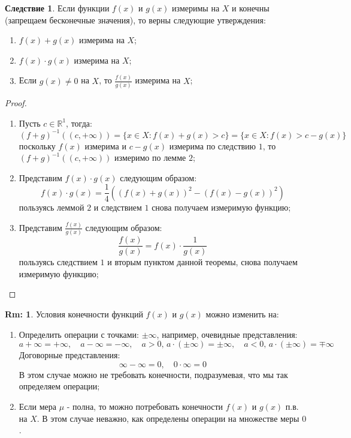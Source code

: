 \documentclass[12pt]{article}
\newcommand{\MR}{\mathbb{R}}
\theoremstyle{definition}
\newtheorem{rem}{Rm:}
\newtheorem{corollary}{Следствие}
\begin{document}
\begin{corollary}
	Если функции $f(x)$ и $g(x)$ измеримы на $X$ и конечны (запрещаем бесконечные значения), то верны следующие утверждения:
	\begin{enumerate}[label = \arabic*)]
		\item $f(x) + g(x)$ измерима на $X$;
		\item $f(x){\cdot}g(x)$ измерима на $X$;
		\item Если $g(x) \neq 0$ на $X$, то $\tfrac{f(x)}{g(x)}$ измерима на $X$;
	\end{enumerate}
\end{corollary}
\begin{proof}\hfill
	\begin{enumerate}[label =\arabic*)]
		\item Пусть $c \in \MR^1$, тогда: 
		$$
			(f + g)^{-1}((c,+\infty)) = \{x \in X \colon f(x) + g(x) > c\} = \{x \in X \colon f(x) > c - g(x)\}
		$$ 
		поскольку $f(x)$ измерима и $c - g(x)$ измерима по следствию $1$, то $(f + g)^{-1}((c,+\infty))$ измеримо по лемме $2$;
		\item Представим $f(x){\cdot}g(x)$ следующим образом:
		$$
			f(x){\cdot}g(x) = \dfrac{1}{4}((f(x) + g(x) )^2 - (f(x) - g(x))^2 )
		$$
		пользуясь леммой $2$ и следствием $1$ снова получаем измеримую функцию;
		\item Представим $\tfrac{f(x)}{g(x)}$ следующим образом:
		$$
			\dfrac{f(x)}{g(x)} = f(x){\cdot}\dfrac{1}{g(x)}
		$$
		пользуясь следствием $1$ и вторым пунктом данной теоремы, снова получаем измеримую функцию;
	\end{enumerate}
\end{proof}
\begin{rem}
	Условия конечности функций $f(x)$ и $g(x)$ можно изменить на:
	\begin{enumerate}[label=\arabic*)]
		\item Определить операции с точками: $\pm \infty$, например, очевидные представления:
		$$
			a + \infty = + \infty, \quad a - \infty = - \infty, \quad a > 0, \, a{\cdot}(\pm\infty) = \pm \infty, \quad a < 0, \, a{\cdot}(\pm \infty) = \mp \infty
		$$
		Договорные представления:
		$$
			\infty - \infty = 0, \quad 0{\cdot}\infty = 0
		$$
		В этом случае можно не требовать конечности, подразумевая, что мы так определяем операции;
		\item Если мера $\mu$ - полна, то можно потребовать конечности $f(x)$ и $g(x)$ п.в. на $X$. В этом случае неважно, как определены операции на множестве меры $0$.
	\end{enumerate}
\end{rem}
\end{document}
